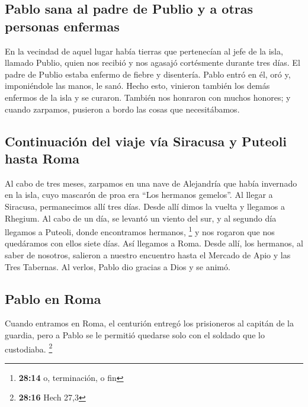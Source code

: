 \hypertarget{pablo-sana-al-padre-de-publio-y-a-otras-personas-enfermas}{%
\subsection{Pablo sana al padre de Publio y a otras personas
enfermas}\label{pablo-sana-al-padre-de-publio-y-a-otras-personas-enfermas}}

 En la vecindad de aquel lugar había tierras que
pertenecían al jefe de la isla, llamado Publio, quien nos recibió y nos
agasajó cortésmente durante tres días.  El padre de Publio
estaba enfermo de fiebre y disentería. Pablo entró en él, oró y,
imponiéndole las manos, le sanó.  Hecho esto, vinieron
también los demás enfermos de la isla y se curaron. 
También nos honraron con muchos honores; y cuando zarpamos, pusieron a
bordo las cosas que necesitábamos.

\hypertarget{continuaciuxf3n-del-viaje-vuxeda-siracusa-y-puteoli-hasta-roma}{%
\subsection{Continuación del viaje vía Siracusa y Puteoli hasta
Roma}\label{continuaciuxf3n-del-viaje-vuxeda-siracusa-y-puteoli-hasta-roma}}

 Al cabo de tres meses, zarpamos en una nave de
Alejandría que había invernado en la isla, cuyo mascarón de proa era
``Los hermanos gemelos''.  Al llegar a Siracusa,
permanecimos allí tres días.  Desde allí dimos la vuelta
y llegamos a Rhegium. Al cabo de un día, se levantó un viento del sur, y
al segundo día llegamos a Puteoli,  donde encontramos
hermanos, \footnote{\textbf{28:14} o, terminación, o fin} y nos rogaron
que nos quedáramos con ellos siete días. Así llegamos a Roma.
 Desde allí, los hermanos, al saber de nosotros, salieron
a nuestro encuentro hasta el Mercado de Apio y las Tres Tabernas. Al
verlos, Pablo dio gracias a Dios y se animó.

\hypertarget{pablo-en-roma}{%
\subsection{Pablo en Roma}\label{pablo-en-roma}}

 Cuando entramos en Roma, el centurión entregó los
prisioneros al capitán de la guardia, pero a Pablo se le permitió
quedarse solo con el soldado que lo custodiaba. \footnote{\textbf{28:16}
  Hech 27,3}

